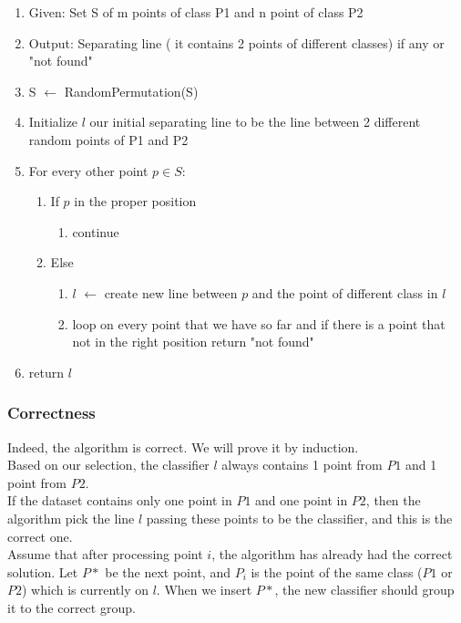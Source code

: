 \begin{enumerate}
\item Given: Set S of m points of class P1 and n point of class P2 
\item Output: Separating line ( it contains 2 points of different classes) if any or "not found"

\item S $\leftarrow$ RandomPermutation(S) 
\item Initialize $l$ our initial separating line to be the line between 2 different random points of P1 and P2
\item For every other point  $p  \in S$:
\begin{enumerate}
\item If $p$ in the proper position
\begin{enumerate}
\item continue 
\end{enumerate}
\item Else  
   \begin{enumerate}
\item $l$  $\leftarrow$ create new line between $p$ and the point of different class in $l$ 
\item loop on every point that we have so far and if there is a point that not in the right position return "not found"

\end{enumerate}    
        
\end{enumerate}

\item return $l$
\end{enumerate}

\subsubsection*{Correctness}
Indeed, the algorithm is correct. We will prove it by induction. \\ 

Based on our selection, the classifier $l$ always contains 1 point from $P1$ and 1 point from $P2$. \\

If the dataset contains only one point in $P1$ and one point in $P2$, then the algorithm pick the line $l$ passing these points to be the classifier, and this is the correct one. \\

Assume that after processing point $i$, the algorithm has already had the correct solution. Let $P*$ be the next point, and $P_i$ is the point of the same class ($P1$ or $P2$) which is 
currently on $l$.  When we insert $P*$, the new classifier should group it to the correct group. \\

